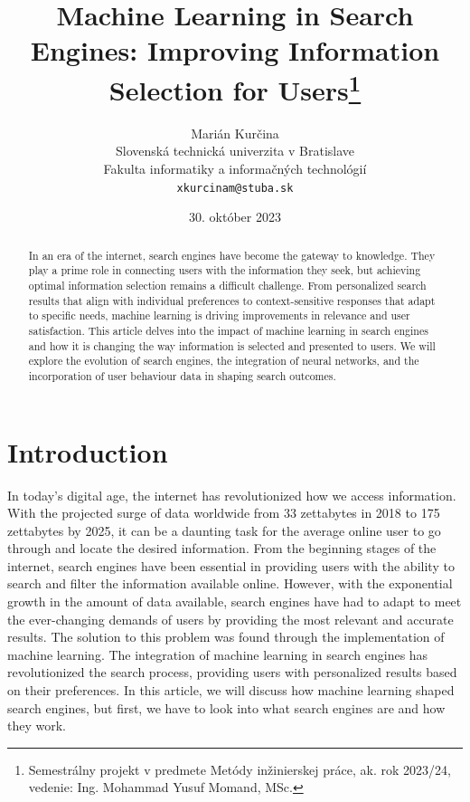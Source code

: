 \documentclass[10pt,a4paper]{article}
\title{Machine Learning in Search Engines: Improving Information Selection for Users\thanks{Semestrálny projekt v predmete Metódy inžinierskej práce, ak. rok 2023/24, vedenie: Ing. Mohammad Yusuf Momand, MSc.}}
\author{Marián Kurčina\\[2pt]
	{\small Slovenská technická univerzita v Bratislave}\\
	{\small Fakulta informatiky a informačných technológií}\\
	{\small \texttt{xkurcinam@stuba.sk}}
	}
\date{\small 30. október 2023}
\begin{document}
\maketitle

\begin{abstract}
In an era of the internet, search engines have become the gateway to knowledge. They play a prime role in connecting users with the information they seek, but achieving optimal information selection remains a difficult challenge. From personalized search results that align with individual preferences to context-sensitive responses that adapt to specific needs, machine learning is driving improvements in relevance and user satisfaction. This article delves into the impact of machine learning in search engines and how it is changing the way information is selected and presented to users. We will explore the evolution of search engines, the integration of neural networks, and the incorporation of user behaviour data in shaping search outcomes.
\end{abstract}



\section{Introduction}
In today's digital age, the internet has revolutionized how we access information. With the projected surge of data worldwide from 33 zettabytes in 2018 to 175 zettabytes by 2025\cite{DJR-Digitalization}, it can be a daunting task for the average online user to go through and locate the desired information. From the beginning stages of the internet, search engines have been essential in providing users with the ability to search and filter the information available online. However, with the exponential growth in the amount of data available, search engines have had to adapt to meet the ever-changing demands of users by providing the most relevant and accurate results. The solution to this problem was found through the implementation of machine learning. The integration of machine learning in search engines has revolutionized the search process, providing users with personalized results based on their preferences.  In this article, we will discuss how machine learning shaped search engines, but first, we have to look into what search engines are and how they work. 
\end{document}
